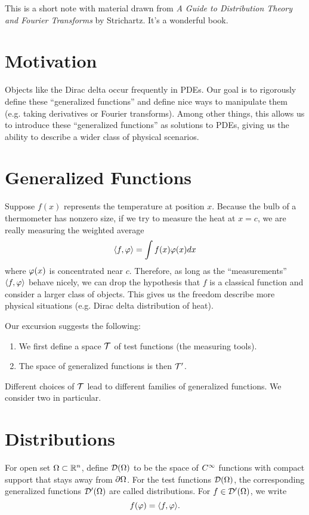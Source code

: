 This is a short note with material drawn from \textit{A Guide to Distribution Theory and Fourier Transforms} by Strichartz. It's a wonderful book.

\sepline

\section{Motivation}
Objects like the Dirac delta occur frequently in PDEs. Our goal is to rigorously define these ``generalized functions'' and define nice ways to manipulate them (e.g. taking derivatives or Fourier transforms). Among other things, this allows us to introduce these ``generalized functions'' as solutions to PDEs, giving us the ability to describe a wider class of physical scenarios.

\section{Generalized Functions}
Suppose $f(x)$ represents the temperature at position $x$. Because the bulb of a thermometer has nonzero size, if we try to measure the heat at $x = c$, we are really measuring the weighted average
\[
    \langle f, \varphi \rangle = \int f(x)\varphi(x)dx
\]
where $\varphi(x)$ is concentrated near $c$. Therefore, as long as the ``measurements'' $\langle f, \varphi \rangle$ behave nicely, we can drop the hypothesis that $f$ is a classical function and consider a larger class of objects. This gives us the freedom describe more physical situations (e.g. Dirac delta distribution of heat).

Our excursion suggests the following:
\begin{enumerate}
    \item We first define a space ${\mathcal T}$ of test functions (the measuring tools).
    \item The space of generalized functions is then ${\mathcal T}'$.
\end{enumerate}

Different choices of ${\mathcal T}$ lead to different families of generalized functions. We consider two in particular.

\section{Distributions}
For open set $\Omega \subset {\mathbb R}^n$, define ${\mathcal D}(\Omega)$ to be the space of $C^\infty$ functions with compact support that stays away from $\partial \Omega$. For the test functions ${\mathcal D}(\Omega)$, the corresponding generalized functions ${\mathcal D}'(\Omega)$ are called distributions. For $f \in {\mathcal D}'(\Omega)$, we write
\[
    f(\varphi) = \langle f, \varphi \rangle.
\]

